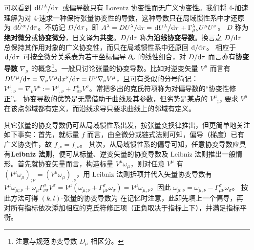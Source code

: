 可以看到 $\dv*{U^\lambda}{\tau}$ 或偏导数只有 Lorentz 协变性而无广义协变性。我们将 4-加速理解为对 4-速求一种保持张量协变性的导数，这种导数只在局域惯性系中才还原为 ${\dd\tilde U^\alpha}/{\dd\tau}$。不妨记 $D/\dd\tau$，即 $A^\lambda={D U^\lambda}/{\dd\tau}=\dv*{U^\lambda}{\tau}+\Gamma^\lambda_{\mu\nu}U^\mu U^\nu$。
$D$ 称为\textbf{绝对微分}或\textbf{协变微分}，日文译为\textbf{共变}。$D/\dd\tau$ 称为\textbf{沿线协变导数}。换言之 $D/\dd\tau$ 总保持其作用对象的广义协变性，而只在局域惯性系中还原回 $\dd/\dd\tau$。
相应于 $\dv*{\tau}$ 可按全微分关系表为若干坐标偏导 $\partial_\nu$ 的线性组合，对 $D/\dd\tau$ 而言亦有\textbf{协变导数} $\nabla_\mu$ 的概念\footnote{注意与规范协变导数 $D_\mu$ 相区分。}。一般只讨论张量的协变导数。比如对逆变矢量 $V^\mu$ 而言有 ${D V^\mu}/{\dd\tau}=\nabla_\nu V^\mu {\dd x^\nu}/{\dd \tau}=U^\nu\nabla_\nu V^\mu$，且可有类似的分号简记：$V^\mu{}_{;\nu}=\nabla_\nu V^\mu :={V^\mu}{}_{,\nu}+\Gamma^\mu_{\sigma\nu}V^\sigma$。常把多出的克氏符项称为对偏导数的“协变性修正”。
协变导数的优势是无需借助于曲线及其参数，但劣势是某点的 $ V^\mu{}_{;\nu}$ 要求 $V^\mu$ 在该点邻域都有定义，而沿线求导只要求曲线上的邻域有定义。

其它张量的协变导数仍可从局域惯性系出发，按张量变换律推出，但更简单地关注如下事实：首先，就标量 $f$ 而言，由全微分或链式法则可知，偏导（梯度）已有广义协变性，故 $f_{;\nu}=f_{,\nu}$。
其次，从局域惯性系的偏导可知，任意协变导数应具有\textbf{Leibniz 法则}，便可从标量、逆变矢量的协变导数及 Leibniz 法则推出一般情形。首先就协变矢量而言，构造标量 $V^\mu\omega_\mu$，则对任意 $V^\mu$ 有 $(V^\mu\omega_\mu)_{;\nu} = (V^\mu\omega_\mu)_{,\nu} $，用 Leibniz 法则拆项并代入矢量协变导数有 $V^\mu \omega_{\mu;\nu}+\omega_{\mu}\Gamma^\mu_{\nu\sigma}V^\sigma=V^\mu(\omega_{\mu;\nu}+\Gamma^\sigma_{\mu\nu}\omega_{\sigma})=V^\mu \omega_{\mu,\nu}$，因此 $\omega_{\mu;\nu}=\omega_{\mu,\nu}-\Gamma^\sigma_{\mu\nu}\omega_\sigma$。
按此方法可得 $(k,l)$-张量的协变导数为
在记忆时注意，此即先填上一个偏导，再对所有指标依次添加相应的克氏符修正项（正负取决于指标上下），并满足指标平衡。


